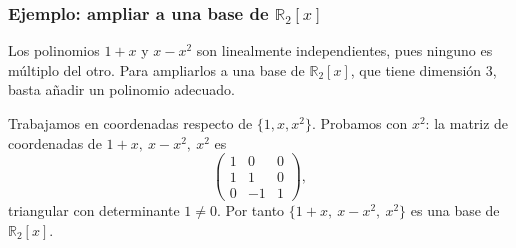 


\begin{frame}
    \frametitle{Ejemplo: ampliar a una base de \(\mathbb{R}_2[x]\)}

    \begin{example}
        Los polinomios \(1+x\) y \(x-x^2\) son linealmente independientes,
        pues ninguno es múltiplo del otro. Para ampliarlos a una base de
        \(\mathbb{R}_2[x]\), que tiene dimensión \(3\), basta añadir un
        polinomio adecuado.

        Trabajamos en coordenadas respecto de \(\{1,x,x^2\}\). Probamos
        con \(x^2\): la matriz de coordenadas de \(1+x,\ x-x^2,\ x^2\) es
        \[
            \begin{pmatrix}
                1&0&0\\
                1&1&0\\
                0&-1&1
            \end{pmatrix},
        \]
        triangular con determinante \(1\neq0\). Por tanto
        \(\{1+x,\ x-x^2,\ x^2\}\) es una base de \(\mathbb{R}_2[x]\).
    \end{example}
\end{frame}

